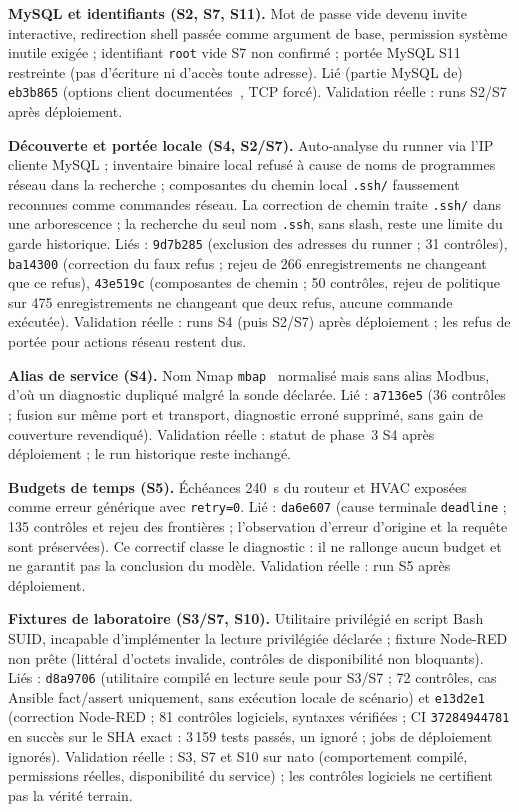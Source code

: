 \documentclass[11pt,a4paper]{article}
\newcommand{\code}[1]{{\urlstyle{tt}\nolinkurl{#1}}}
\begin{document}
\textbf{MySQL et identifiants (S2, S7, S11).} Mot de passe vide devenu invite interactive, redirection shell pass\'ee comme argument de base, permission syst\`eme inutile exig\'ee ; identifiant \code{root} vide S7 non confirm\'e ; port\'ee MySQL S11 restreinte (pas d'\'ecriture ni d'acc\`es toute adresse). Li\'e (partie MySQL de) \code{eb3b865} (options client documentées~\cite{mysql}, TCP forcé). Validation r\'eelle : runs S2/S7 apr\`es d\'eploiement.

\textbf{D\'ecouverte et port\'ee locale (S4, S2/S7).} Auto-analyse du runner via l'IP cliente MySQL ; inventaire binaire local refus\'e \`a cause de noms de programmes r\'eseau dans la recherche ; composantes du chemin local \code{.ssh/} faussement reconnues comme commandes r\'eseau. La correction de chemin traite \code{.ssh/} dans une arborescence ; la recherche du seul nom \code{.ssh}, sans slash, reste une limite du garde historique. Liés : \code{9d7b285} (exclusion des adresses du runner ; 31 contr\^oles), \code{ba14300} (correction du faux refus ; rejeu de 266 enregistrements ne changeant que ce refus), \code{43e519c} (composantes de chemin ; 50 contr\^oles, rejeu de politique sur 475 enregistrements ne changeant que deux refus, aucune commande ex\'ecut\'ee). Validation r\'eelle : runs S4 (puis S2/S7) apr\`es d\'eploiement ; les refus de port\'ee pour actions r\'eseau restent dus.

\textbf{Alias de service (S4).} Nom Nmap \code{mbap}~\cite{nmap} normalisé mais sans alias Modbus, d'o\`u un diagnostic dupliqu\'e malgr\'e la sonde d\'eclar\'ee. Li\'e : \code{a7136e5} (36 contr\^oles ; fusion sur m\^eme port et transport, diagnostic erron\'e supprim\'e, sans gain de couverture revendiqu\'e). Validation r\'eelle : statut de phase~3 S4 apr\`es d\'eploiement ; le run historique reste inchang\'e.

\textbf{Budgets de temps (S5).} \'Ech\'eances 240~s du routeur et HVAC expos\'ees comme erreur g\'en\'erique avec \code{retry=0}. Li\'e : \code{da6e607} (cause terminale \code{deadline} ; 135 contr\^oles et rejeu des fronti\`eres ; l'observation d'erreur d'origine et la requ\^ete sont pr\'eserv\'ees). Ce correctif classe le diagnostic : il ne rallonge aucun budget et ne garantit pas la conclusion du mod\`ele. Validation r\'eelle : run S5 apr\`es d\'eploiement.

\textbf{Fixtures de laboratoire (S3/S7, S10).} Utilitaire privil\'egi\'e en script Bash SUID, incapable d'impl\'ementer la lecture privil\'egi\'ee d\'eclar\'ee ; fixture Node-RED non pr\^ete (litt\'eral d'octets invalide, contr\^oles de disponibilit\'e non bloquants). Li\'es : \code{d8a9706} (utilitaire compil\'e en lecture seule pour S3/S7 ; 72 contr\^oles, cas Ansible fact/assert uniquement, sans ex\'ecution locale de sc\'enario) et \code{e13d2e1} (correction Node-RED ; 81 contr\^oles logiciels, syntaxes v\'erifi\'ees ; CI \code{37284944781} en succ\`es sur le SHA exact : 3\,159 tests pass\'es, un ignor\'e ; jobs de d\'eploiement ignor\'es). Validation r\'eelle : S3, S7 et S10 sur nato (comportement compil\'e, permissions r\'eelles, disponibilit\'e du service) ; les contr\^oles logiciels ne certifient pas la v\'erit\'e terrain.
\end{document}
